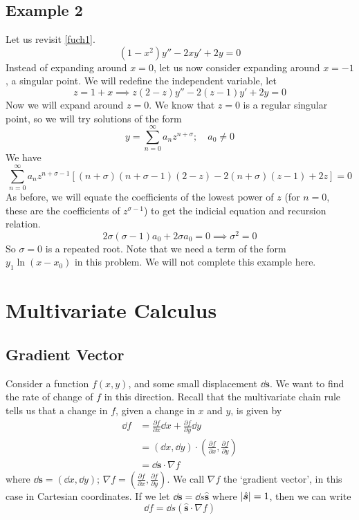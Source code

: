 \documentclass{article}
\begin{document}
	\subsection{Example 2}
	Let us revisit \eqref{fuch1}.
	\[ (1-x^2)y'' - 2xy' + 2y = 0 \]
	Instead of expanding around $x=0$, let us now consider expanding around $x=-1$, a singular point. We will redefine the independent variable, let
	\[ z = 1 + x \implies z(2-z)y'' - 2(z-1)y' + 2y = 0 \]
	Now we will expand around $z=0$. We know that $z=0$ is a regular singular point, so we will try solutions of the form
	\[ y = \sum_{n=0}^\infty a_nz^{n+\sigma};\quad a_0 \neq 0 \]
	We have
	\[ \sum_{n=0}^\infty a_nz^{n+\sigma-1}\left[ (n+\sigma)(n+\sigma-1)(2-z) - 2(n+\sigma)(z-1) + 2z \right] = 0 \]
	As before, we will equate the coefficients of the lowest power of $z$ (for $n=0$, these are the coefficients of $z^{\sigma - 1}$) to get the indicial equation and recursion relation.
	\[ 2\sigma(\sigma - 1)a_0 + 2\sigma a_0 = 0 \implies \sigma^2 = 0 \]
	So $\sigma = 0$ is a repeated root. Note that we need a term of the form $y_1\ln (x-x_0)$ in this problem. We will not complete this example here.

	\section{Multivariate Calculus}
	\subsection{Gradient Vector}
	Consider a function $f(x, y)$, and some small displacement $\dd \bm s$. We want to find the rate of change of $f$ in this direction. Recall that the multivariate chain rule tells us that a change in $f$, given a change in $x$ and $y$, is given by
	\begin{align*}
		\dd f &= \frac{\partial f}{\partial x} \dd x + \frac{\partial f}{\partial y}\dd y \\
		&= (\dd x, \dd y) \cdot \left( \frac{\partial f}{\partial x}, \frac{\partial f}{\partial y} \right) \\
		&= \dd \bm s \cdot \nabla f
	\end{align*}
	where $\dd \bm s = (\dd x, \dd y)$; $\nabla f = \left( \frac{\partial f}{\partial x}, \frac{\partial f}{\partial y} \right)$. We call $\nabla f$ the `gradient vector', in this case in Cartesian coordinates. If we let $\dd \bm s = \dd s \hat{\bm s}$ where $\abs{\hat{\bm s}} = 1$, then we can write
	\[ \dd f = \dd s (\hat{\bm s}\cdot \nabla f) \]
\end{document}
